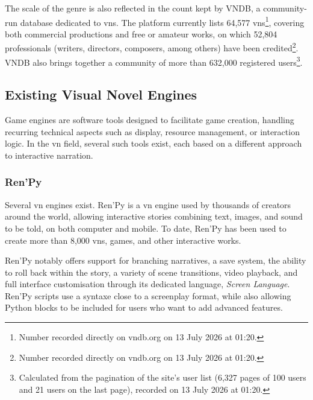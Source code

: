 The scale of the genre is also reflected in the count kept by VNDB, a community-run database dedicated to \glspl{vn}. The platform currently lists 64,577 \glspl{vn}\footnote{Number recorded directly on vndb.org on 13 July 2026 at 01:20.}, covering both commercial productions and free or amateur works, on which 52,804 professionals (writers, directors, composers, among others) have been credited\footnote{Number recorded directly on vndb.org on 13 July 2026 at 01:20.}. VNDB also brings together a community of more than 632,000 registered users\footnote{Calculated from the pagination of the site's user list (6,327 pages of 100 users and 21 users on the last page), recorded on 13 July 2026 at 01:20.}. \parencite{vndb_visual_nodate}



\subsection{Existing Visual Novel Engines}
\label{sec:moteur_vn_existant}

Game engines are software tools designed to facilitate game creation, handling recurring technical aspects such as display, resource management, or interaction logic. In the \gls{vn} field, several such tools exist, each based on a different approach to interactive narration.



\subsubsection{Ren'Py}

Several \gls{vn} engines exist. Ren'Py is a \gls{vn} engine used by thousands of creators around the world, allowing interactive stories combining text, images, and sound to be told, on both computer and mobile. To date, Ren'Py has been used to create more than 8,000 \glspl{vn}, games, and other interactive works. \parencite{noauthor_renpy_nodate}

Ren'Py notably offers support for branching narratives, a save system, the ability to roll back within the story, a variety of scene transitions, video playback, and full interface customisation through its dedicated language, \textit{Screen Language}. Ren'Py scripts use a \gls{syntaxe} close to a screenplay format, while also allowing Python blocks to be included for users who want to add advanced features. \parencite{noauthor_renpy_nodate}

\clearpage

